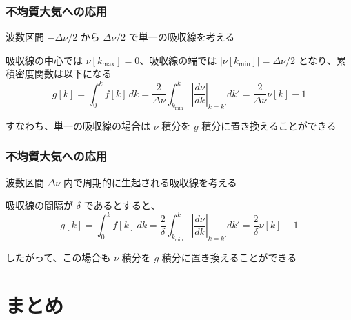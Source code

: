 \documentclass[unicode,colorlinks]{beamer}
\begin{document}
\begin{frame}
	\frametitle{不均質大気への応用}
	波数区間 $-\Delta\nu/2$ から $\Delta\nu/2$ で単一の吸収線を考える

	吸収線の中心では $\nu[k_{\mathrm{max}}]=0$、吸収線の端では
	$|\nu[k_{\mathrm{min}}]|=\Delta\nu/2$ となり、累積密度関数は以下になる
	\[
		g[k]=\int^k_0 f[k]\,dk
		=\frac{2}{\Delta\nu}\int^k_{k_{\mathrm{min}}}\left|\frac{d\nu}{dk}\right|_{k=k'}dk'
		=\frac{2}{\Delta\nu}\nu[k]-1
	\]

	すなわち、単一の吸収線の場合は $\nu$ 積分を $g$ 積分に置き換えることができる
\end{frame}

\begin{frame}
	\frametitle{不均質大気への応用}
	波数区間 $\Delta\nu$ 内で周期的に生起される吸収線を考える

	吸収線の間隔が $\delta$ であるとすると、
	\[
		g[k]=\int^k_0 f[k]\,dk
		=\frac{2}{\delta}\int^k_{k_{\mathrm{min}}}\left|\frac{d\nu}{dk}\right|_{k=k'}dk'
		=\frac{2}{\delta}\nu[k]-1
	\]

	したがって、この場合も $\nu$ 積分を $g$ 積分に置き換えることができる
\end{frame}

% 

\section{まとめ}
\end{document}
